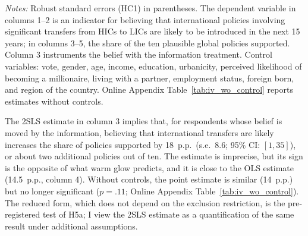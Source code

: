 \documentclass[12pt,english]{article}
\begin{document}
\begin{table}[htbp]
  \centering
  \caption{Effect of Believing That International Transfers Are Likely on Support for Global Policies}\label{tab:iv}
  \footnotesize
  \makebox[\textwidth][c]{}
  \begin{minipage}{\textwidth}
  \vspace{3pt}
  \footnotesize \textit{Notes:} Robust standard errors (HC1) in parentheses. The dependent variable in columns 1--2 is an indicator for believing that international policies involving significant transfers from HICs to LICs are likely to be introduced in the next 15 years; in columns 3--5, the share of the ten plausible global policies supported. Column 3 instruments the belief with the information treatment. Control variables: vote, gender, age, income, education, urbanicity, perceived likelihood of becoming a millionaire, living with a partner, employment status, foreign born, and region of the country. Online Appendix Table~\ref{tab:iv_wo_control} reports estimates without controls.
  \end{minipage}
\end{table}

The 2SLS estimate in column 3 implies that, for respondents whose belief is moved by the information, believing that international transfers are likely increases the share of policies supported by 18~p.p.\ (s.e.\ 8.6; 95\% CI: $[1, 35]$), or about two additional policies out of ten. The estimate is imprecise, but its sign is the opposite of what warm glow predicts, and it is close to the OLS estimate (14.5~p.p., column 4). Without controls, the point estimate is similar (14~p.p.) but no longer significant ($p = .11$; Online Appendix Table~\ref{tab:iv_wo_control}). The reduced form, which does not depend on the exclusion restriction, is the pre-registered test of H5a; I view the 2SLS estimate as a quantification of the same result under additional assumptions.
\end{document}

